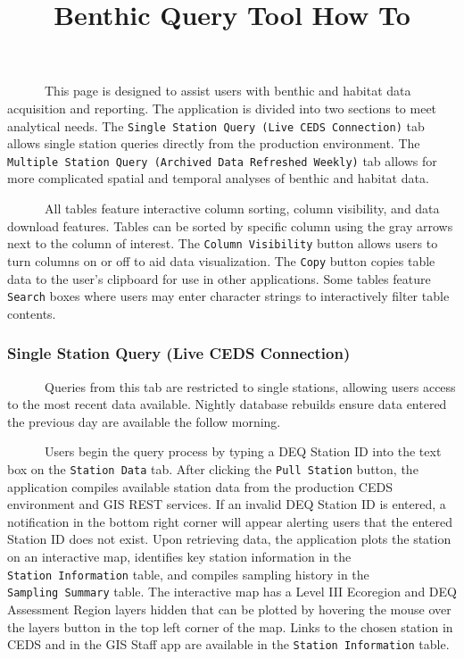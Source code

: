 \documentclass[
]{article}
\title{Benthic Query Tool How To}
\author{}
\date{\vspace{-2.5em}}
\begin{document}
\maketitle

~~~~~~This page is designed to assist users with benthic and habitat
data acquisition and reporting. The application is divided into two
sections to meet analytical needs. The
\texttt{Single\ Station\ Query\ (Live\ CEDS\ Connection)} tab allows
single station queries directly from the production environment. The
\texttt{Multiple\ Station\ Query\ (Archived\ Data\ Refreshed\ Weekly)}
tab allows for more complicated spatial and temporal analyses of benthic
and habitat data.

~~~~~~All tables feature interactive column sorting, column visibility,
and data download features. Tables can be sorted by specific column
using the gray arrows next to the column of interest. The
\texttt{Column\ Visibility} button allows users to turn columns on or
off to aid data visualization. The \texttt{Copy} button copies table
data to the user's clipboard for use in other applications. Some tables
feature \texttt{Search} boxes where users may enter character strings to
interactively filter table contents.

\hypertarget{single-station-query-live-ceds-connection}{%
\subsubsection{Single Station Query (Live CEDS
Connection)}\label{single-station-query-live-ceds-connection}}

~~~~~~Queries from this tab are restricted to single stations, allowing
users access to the most recent data available. Nightly database
rebuilds ensure data entered the previous day are available the follow
morning.

~~~~~~Users begin the query process by typing a DEQ Station ID into the
text box on the \texttt{Station\ Data} tab. After clicking the
\texttt{Pull\ Station} button, the application compiles available
station data from the production CEDS environment and GIS REST services.
If an invalid DEQ Station ID is entered, a notification in the bottom
right corner will appear alerting users that the entered Station ID does
not exist. Upon retrieving data, the application plots the station on an
interactive map, identifies key station information in the
\texttt{Station\ Information} table, and compiles sampling history in
the \texttt{Sampling\ Summary} table. The interactive map has a Level
III Ecoregion and DEQ Assessment Region layers hidden that can be
plotted by hovering the mouse over the layers button in the top left
corner of the map. Links to the chosen station in CEDS and in the GIS
Staff app are available in the \texttt{Station\ Information} table.
\end{document}
